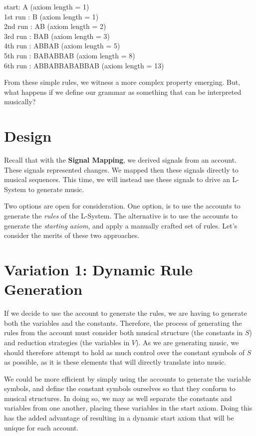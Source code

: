 \begin{singlespace}
\begin{formality}
start: A (axiom length = 1)\\
1st run : B (axiom length = 1)\\
2nd run : AB (axiom length = 2)\\
3rd run : BAB (axiom length = 3)\\
4th run : ABBAB (axiom length = 5)\\
5th run : BABABBAB (axiom length = 8)\\
6th run : ABBABBABABBAB (axiom length = 13)
\end{formality}
\end{singlespace}

From these simple rules, we witness a more complex property emerging. But, what happens if we define our grammar as something that can be interpreted musically?

\section{Design}
Recall that with the \textbf{Signal Mapping}, we derived signals from an account. These signals represented changes. We mapped then these signals directly to musical sequences. This time, we will instead use these signals to drive an L-System to generate music.

Two options are open for consideration. One option, is to use the accounts to generate the \textit{rules} of the L-System. The alternative is to use the accounts to generate the \textit{starting axiom}, and apply a manually crafted set of rules. Let's consider the merits of these two approaches.

\section{Variation 1: Dynamic Rule Generation}

If we decide to use the account to generate the rules, we are having to generate both the variables and the constants. Therefore, the process of generating the rules from the account must consider both musical structure (the constants in $S$) and reduction strategies (the variables in $V$). As we are generating music, we should therefore attempt to hold as much control over the constant symbols of $S$ as possible, as it is these elements that will directly translate into music.

We could be more efficient by simply using the accounts to generate the variable symbols, and define the constant symbols ourselves so that they conform to musical structures. In doing so, we may as well separate the constants and variables from one another, placing these variables in the start axiom. Doing this has the added advantage of resulting in a dynamic start axiom that will be unique for each account.

